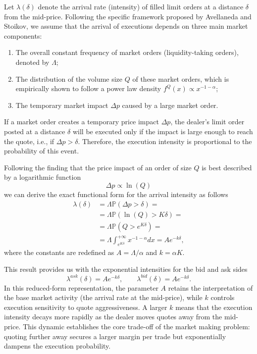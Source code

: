 Let $\lambda(\delta)$ denote the arrival rate (intensity) of filled limit orders at a distance $\delta$ from the mid-price. Following the specific framework proposed by Avellaneda and Stoikov, we assume that the arrival of executions depends on three main market components:
\begin{enumerate}
    \item The overall constant frequency of market orders (liquidity-taking orders), denoted by $\Lambda$;
    \item The distribution of the volume size $Q$ of these market orders, which is empirically shown to follow a power law density $f^Q(x) \propto x^{-1-\alpha}$;
    \item The temporary market impact $\Delta p$ caused by a large market order.
\end{enumerate}
If a market order creates a temporary price impact $\Delta p$, the dealer's limit order posted at a distance $\delta$ will be executed only if the impact is large enough to reach the quote, i.e., if $\Delta p>\delta$. Therefore, the execution intensity is proportional to the probability of this event.

Following the finding that the price impact of an order of size $Q$ is best described by a logarithmic function 
\[
\Delta p \propto \ln{(Q)} 
\]
we can derive the exact functional form for the arrival intensity as follows
\begin{align*}
    \lambda(\delta)&=\Lambda \mathbb{P}(\Delta p>\delta)=\\
    &=\Lambda \mathbb{P}(\ln{(Q)}>K\delta)=\\
    &=\Lambda \mathbb{P}(Q>e^{K\delta})=\\
    &=\Lambda \int_{e^{K\delta}}^{+\infty}x^{-1-\alpha}dx= Ae^{-k\delta},
\end{align*}
where the constants are redefined as $A = \Lambda /\alpha$ and $k=\alpha K$.

This result provides us with the exponential intensities for the bid and ask sides
\[
\lambda^{ask}(\delta)=Ae^{-k\delta}, \qquad \lambda^{bid}(\delta)=Ae^{-k\delta}.
\]
In this reduced-form representation, the parameter $A$ retains the interpretation of the base market activity (the arrival rate at the mid-price), while $k$ controls execution sensitivity to quote aggressiveness. A larger $k$ means that the execution intensity decays more rapidly as the dealer moves quotes away from the mid-price. This dynamic establishes the core trade-off of the market making problem: quoting further away secures a larger margin per trade but exponentially dampens the execution probability.

